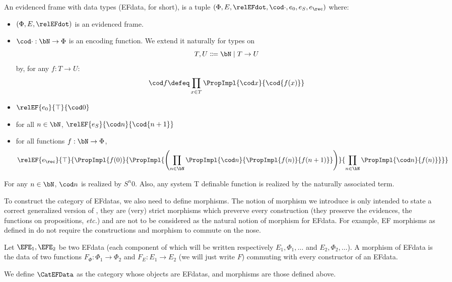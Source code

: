 \begin{definition}
  An evidenced frame with data types (EFdata, for short),
  is a tuple $(\Phi,E,\relEFdot, \cod \cdot, e_0, e_S, e_{\rec})$ where:
  \begin{itemize}
  \item $(\Phi,E,\relEFdot)$ is an evidenced frame.
  \item $\cod \cdot : \bN \to \Phi$ is an encoding function. We extend it naturally for types on
    \[T,U \Coloneq \bN \mid T \to U\]
    by, for any $f : T \to U$:
    \[\cod f \defeq \prod_{x \in T} \PropImpl{\cod x}{\cod{f(x)}}\]
  \item $\relEF{e_0}{\top}{\cod 0}$
  \item for all $n \in \bN$, $\relEF{e_S}{\cod n}{\cod{n + 1}}$
  \item for all functions $f : \bN \to \Phi$,
    \[\relEF{e_{\rec}}{\top}{\PropImpl{f(0)}{\PropImpl{\left(\prod_{n \in \bN}\PropImpl{\cod n}{\PropImpl{f(n)}{f(n+1)}}\right)}{\prod_{n \in \bN} \PropImpl{\cod n}{f(n)}}}}\]
  \end{itemize}
\end{definition}

\begin{remark}
  For any $n \in \bN$, $\cod n$ is realized by $S^n 0$. Also, any system T definable function is realized by the naturally associated term.
\end{remark}

To construct the category of EFdatas, we also need to define morphisms.
The notion of morphism we introduce is only intended to state a correct generalized version
of , they are (very) strict morphisms which preverve every construction
(they preserve the evidences, the functions on propositions, \textit{etc.})
and are not to be considered as the natural notion of morphism for EFdata.
For example, EF morphisms as defined in \cite{CohMiqTat21} do not require
the constructions and morphism to commute on the nose.

\begin{definition}\label{def:efdata}
  Let $\EFE_1,\EFE_2$ be two EFdata (each component of which will be written respectively $E_1,\Phi_1,\ldots$ and $E_2,\Phi_2,\ldots$). A morphism of EFdata is the data of two functions $F_{\Phi} : \Phi_1 \to \Phi_2$ and $F_E : E_1 \to E_2$ (we will just write $F$) commuting with every constructor of an EFdata.

  We define $\CatEFData$ as the category whose objects are EFdatas, and morphisms are those defined above.
\end{definition}

